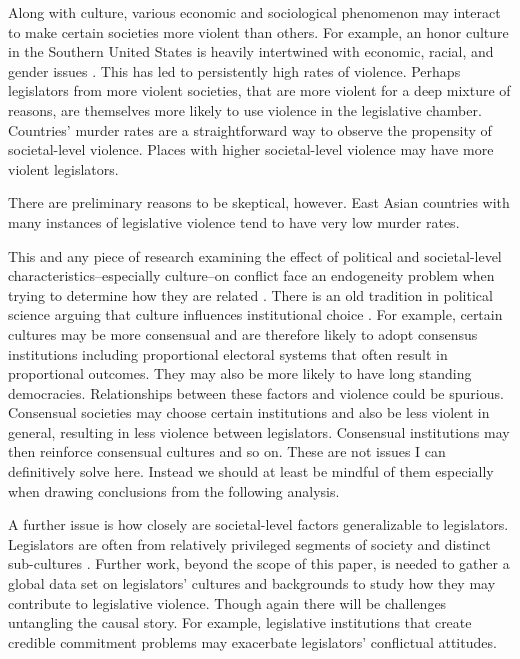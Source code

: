 \documentclass[a4paper]{article}\usepackage[]{graphicx}\usepackage[]{color}
\begin{document}
Along with culture, various economic and sociological phenomenon may interact to make certain societies more violent than others. For example, an honor culture in the Southern United States is heavily intertwined with economic, racial, and gender issues \citep[see][]{nisbett1996culture}. This has led to persistently high rates of violence. Perhaps legislators from more violent societies, that are more violent for a deep mixture of reasons, are themselves more likely to use violence in the legislative chamber. Countries' murder rates are a straightforward way to observe the propensity of societal-level violence. Places with higher societal-level violence may have more violent legislators. 

There are preliminary reasons to be skeptical, however. East Asian countries with many instances of legislative violence tend to have very low murder rates.

This and any piece of research examining the effect of political and societal-level characteristics--especially culture--on conflict face an endogeneity problem when trying to determine how they are related \citep[][751]{Carey2000}. There is an old tradition in political science \citep[][528--529]{Frye1997} arguing that culture influences institutional choice \citep[in particular see][]{Almond1963}. For example, certain cultures may be more consensual and are therefore likely to adopt consensus institutions \citep[][22-23]{Lijphart2003} including proportional electoral systems that often result in proportional outcomes. They may also be more likely to have long standing democracies. Relationships between these factors and violence could be spurious. Consensual societies may choose certain institutions and also be less violent in general, resulting in less violence between legislators. Consensual institutions may then reinforce consensual cultures and so on. These are not issues I can definitively solve here. Instead we should at least be mindful of them especially when drawing conclusions from the following analysis.

A further issue is how closely are societal-level factors generalizable to legislators. Legislators are often from relatively privileged segments of society and distinct sub-cultures \citep[408]{Spary2013}. Further work, beyond the scope of this paper, is needed to gather a global data set on legislators' cultures and backgrounds to study how they may contribute to legislative violence. Though again there will be challenges untangling the causal story. For example, legislative institutions that create credible commitment problems may exacerbate legislators' conflictual attitudes.   
\end{document}
